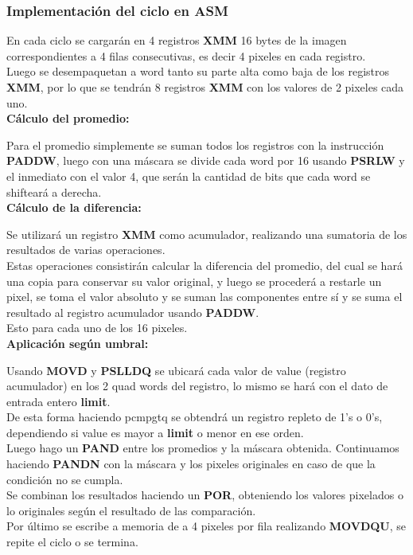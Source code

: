\subsubsection{Implementación del ciclo en ASM}

En cada ciclo se cargarán en 4 registros \textbf{XMM} 16 bytes de la imagen correspondientes a 4 filas consecutivas, es decir 4 pixeles en cada registro. \\
Luego se desempaquetan a word tanto su parte alta como baja de los registros \textbf{XMM}, por lo que se tendrán 8 registros \textbf{XMM} con los valores de 2 pixeles cada uno.\\

{\centering\textbf{Cálculo del promedio:}}

Para el promedio simplemente se suman todos los registros con la instrucción \textbf{PADDW}, luego con una máscara se divide cada word por 16 usando \textbf{PSRLW} y el inmediato con el valor 4, que serán la cantidad de bits que cada word se shifteará a derecha. \\

{\centering\textbf{Cálculo de la diferencia:}}

Se utilizará un registro \textbf{XMM} como acumulador, realizando una sumatoria de los resultados de varias operaciones.\\
Estas operaciones consistirán calcular la diferencia del promedio, del cual se hará una copia para conservar su valor original, y luego se procederá a restarle un pixel, se toma el valor absoluto y se suman las componentes entre sí y se suma el resultado al registro acumulador usando \textbf{PADDW}. \\
Esto para cada uno de los 16 pixeles. \\

{\centering\textbf{Aplicación según umbral:}}

Usando \textbf{MOVD} y \textbf{PSLLDQ} se ubicará cada valor de value (registro acumulador) en los 2 quad words del registro, lo mismo se hará con el dato de entrada entero \textbf{limit}. \\
De esta forma haciendo pcmpgtq se obtendrá un registro repleto de 1's o 0's, dependiendo si value es mayor a \textbf{limit} o menor en ese orden. \\
Luego hago un \textbf{PAND} entre los promedios y la máscara obtenida. 
Continuamos haciendo \textbf{PANDN} con la máscara y los pixeles originales en caso de que la condición no se cumpla. \\
Se combinan los resultados haciendo un \textbf{POR}, obteniendo los valores pixelados o lo originales según el resultado de las comparación.\\
Por último se escribe a memoria de a 4 pixeles por fila realizando \textbf{MOVDQU}, se repite el ciclo o se termina.
